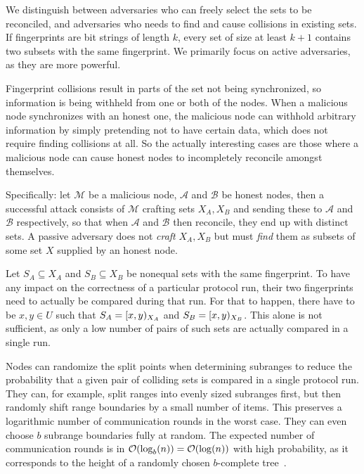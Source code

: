 \documentclass[conference]{IEEEtran}
\begin{document}
We distinguish between  adversaries who can freely select the sets to be reconciled, and  adversaries who needs to find and cause collisions in existing sets. If fingerprints are bit strings of length $k$, every set of size at least $k + 1$ contains two subsets with the same fingerprint. We primarily focus on active adversaries, as they are more powerful.

Fingerprint collisions result in parts of the set not being synchronized, so information is being withheld from one or both of the nodes. When a malicious node synchronizes with an honest one, the malicious node can withhold arbitrary information by simply pretending not to have certain data, which does not require finding collisions at all. So the actually interesting cases are those where a malicious node can cause honest nodes to incompletely reconcile amongst themselves.

Specifically: let $\mathcal{M}$ be a malicious node, $\mathcal{A}$ and $\mathcal{B}$ be honest nodes, then a successful attack consists of $\mathcal{M}$ crafting sets $X_A, X_B$ and sending these to $\mathcal{A}$ and $\mathcal{B}$ respectively, so that when $\mathcal{A}$ and $\mathcal{B}$ then reconcile, they end up with distinct sets. A passive adversary does not \textit{craft} $X_A, X_B$ but must \textit{find} them as subsets of some set $X$ supplied by an honest node.

Let $S_A \subseteq X_A$ and $S_B \subseteq X_B$ be nonequal sets with the same fingerprint. To have any impact on the correctness of a particular protocol run, their two fingerprints need to actually be compared during that run. For that to happen, there have to be $x, y \in U$ such that $S_A = [{x},{y})_{X_A}$ and $S_B = [{x},{y})_{X_B}$. This alone is not sufficient, as only a low number of pairs of such sets are actually compared in a single run.

Nodes can randomize the split points when determining subranges to reduce the probability that a given pair of colliding sets is compared in a single protocol run. They can, for example, split ranges into evenly sized subranges first, but then randomly shift range boundaries by a small number of items. This preserves a logarithmic number of communication rounds in the worst case. They can even choose $b$ subrange boundaries fully at random. The expected number of communication rounds is in $\mathcal{O}(\log_b(n)) = \mathcal{O}(\log(n))$ with high probability, as it corresponds to the height of a randomly chosen $b$-complete tree~\cite{devroye1990height}.
\end{document}
